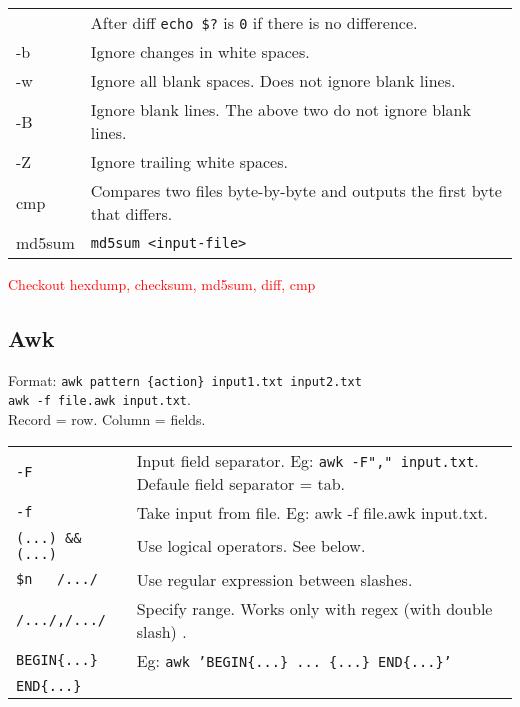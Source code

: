 \begin{tabularx}{\linewidth}{lX}
                            & After diff \texttt{echo \$?}  is \texttt{0} if there is no difference.\\
    -b                      & Ignore changes in white spaces.\\
    -w                      & Ignore all blank spaces. Does not ignore blank lines.\\
    -B                      & Ignore blank lines. The above two do not ignore blank lines.\\
    -Z                      & Ignore trailing white spaces.\\
    \hline
    cmp                     & Compares two files byte-by-byte and outputs the first byte that differs.\\ 
    \hline
    md5sum                  & \texttt{md5sum <input-file>}\\
    \hline
\end{tabularx}

\textcolor{red}{Checkout hexdump, checksum, md5sum, diff, cmp}


\vfill\null
\columnbreak

\subsection{Awk}

Format: \texttt{awk pattern \{action\} input1.txt input2.txt} \\ \texttt{awk -f file.awk input.txt}.\\ Record = row. Column = fields. \\

\begin{tabularx}{\linewidth}{lX}
    \texttt{-F} & Input field separator. Eg: \texttt{awk -F"," input.txt}. Defaule field separator = tab.\\
    \texttt{-f} & Take input from file. Eg: awk -f file.awk input.txt.\\
    \texttt{(...) \&\& (...)} &  Use logical operators. See below.\\
    \texttt{\$n ~ /.../} & Use regular expression between slashes.\\
    \texttt{/.../,/.../} & Specify range. Works only with regex (with double slash) .\\
    \texttt{BEGIN\{...\}} & Eg: \texttt{awk 'BEGIN\{...\} ... \{...\} END\{...\}'}\\
    \texttt{END\{...\}} & \\
    \hline
\end{tabularx}

